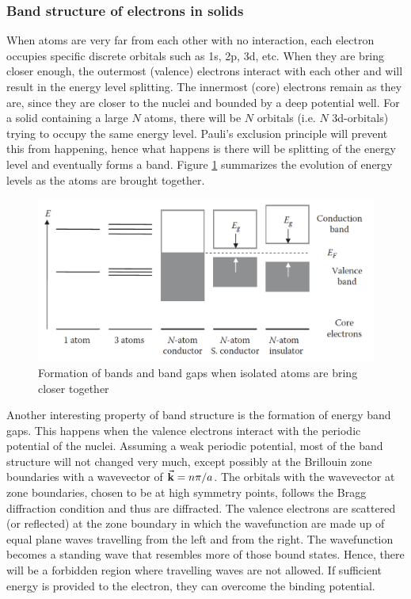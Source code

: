 \subsubsection{Band structure of electrons in solids}
When atoms are very far from each other with no interaction, each electron occupies specific discrete orbitals such as 1s, 2p, 3d, etc. When they are bring  closer enough, the outermost (valence) electrons interact with each other and will result in the  energy level splitting. The innermost (core) electrons remain as they are, since they are closer to the nuclei and bounded by a deep potential well. For a solid containing a large $N$ atoms, there will be $N$ orbitals (i.e. $N$ 3d-orbitals) trying to occupy the same energy level. Pauli's exclusion principle will prevent this from happening, hence what happens is there will be splitting of the energy level and eventually forms a band. Figure \ref{fig:band_model} summarizes the evolution of energy levels as the atoms are brought together.

\begin{figure}[tbh!]
	\centering
	\includegraphics[width=0.7\linewidth]{"images/band model"}
	\caption[Band structure in solids]{Formation of bands and band gaps when isolated atoms are bring closer together}
	\label{fig:band_model}
\end{figure}    

Another interesting property of band structure is the formation of energy band gaps. This happens when the valence electrons interact with the periodic potential of the nuclei. Assuming a weak periodic potential, most of the band structure will not changed very much, except possibly at the Brillouin zone boundaries with a wavevector of $\va{k} = n \pi/ a$. The orbitals with the wavevector at zone boundaries, chosen to be at high symmetry points, follows the Bragg diffraction condition and thus are diffracted. The valence electrons are scattered (or reflected) at the zone boundary in which the wavefunction are made up of equal plane waves travelling from the left and from the right. The wavefunction becomes a standing wave that resembles more of those bound states. Hence, there will be a forbidden region where travelling waves are not allowed. If sufficient energy is provided to the electron, they can overcome the  binding potential.


